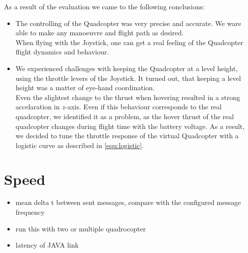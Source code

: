 As a result of the evaluation we came to the following conclusions:

\begin{itemize}
\item{The controlling of the Quadcopter was very precise and accurate. We ware able to make any manoeuvre and flight path as desired. \\ When flying with the Joystick, one can get a real feeling
of the Quadcopter flight dynamics and behaviour}.

\item{We experienced challenges with keeping the Quadcopter at a level height, using the throttle levers of the Joystick. It turned out, that keeping a level height was a matter of eye-hand coordination. \\
Even the slightest change to the thrust when hovering resulted in a strong accelaration in $z$-axis. Even if this behaviour corresponds to the real quadcopter, we identified it as a problem, as the hover thrust of the real quadcopter changes during flight time with the battery voltage. As a result, we decided to tune the throttle response of the virtual Quadcopter with a logistic curve as described in \ref{equ:logistic}}.

\end{itemize}

\section{Speed}


\begin{itemize}

\item{mean delta t between sent messages, compare with the configured message frequency}
\item{ run this with two or multiple quadrocopter}
\item{latency of JAVA link}
\end{itemize}




